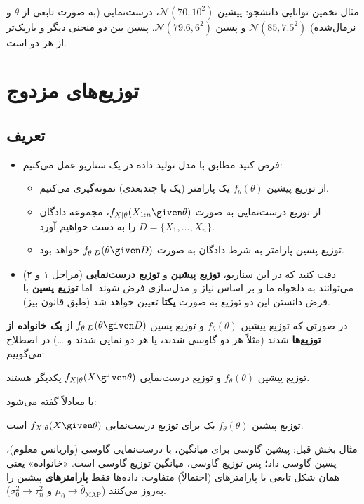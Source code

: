 \begin{center}
\begin{tikzpicture}
\end{tikzpicture}\\
{\small مثال تخمین توانایی دانشجو: پیشین $\mathcal N(70,10^2)$، درست‌نمایی (به صورت تابعی از $\theta$ و نرمال‌شده) $\mathcal N(85,7.5^2)$ و پسین $\mathcal N(79.6,6^2)$. پسین بین دو منحنی دیگر و باریک‌تر از هر دو است.}
\end{center}

\section{توزیع‌های مزدوج }

\subsection{تعریف}
\begin{itemize}
\item فرض کنید مطابق با مدل تولید داده  در یک سناریو  عمل می‌کنیم:
\begin{itemize}
\item از توزیع پیشین $f_\theta(\theta)$ یک پارامتر (یک یا چندبعدی) نمونه‌گیری می‌کنیم.
\item از توزیع درست‌نمایی  به صورت $f_{X|\theta}(X_{1:n}\given\theta)$، مجموعه دادگان $D=\{X_1,\ldots,X_n\}$ را به دست خواهیم آورد.
\item توزیع پسین پارامتر به شرط دادگان به صورت $f_{\theta|D}(\theta\given D)$ خواهد بود.
\end{itemize}
\item دقت کنید که در این سناریو، \textbf{توزیع پیشین} و \textbf{توزیع درست‌نمایی} (مراحل ۱ و ۲) می‌توانند به دلخواه ما و بر اساس نیاز و مدل‌سازی فرض شوند. اما \textbf{توزیع پسین} با فرض دانستن این دو توزیع به صورت \textbf{یکتا} تعیین خواهد شد (طبق قانون بیز).
\end{itemize}

\begin{definition}
در صورتی که توزیع پیشین $f_\theta(\theta)$ و توزیع پسین $f_{\theta|D}(\theta\given D)$ از \textbf{یک خانواده از توزیع‌ها} شدند (مثلاً هر دو گاوسی شدند، یا هر دو نمایی شدند و \ldots) در اصطلاح می‌گوییم:
\begin{center}
توزیع پیشین $f_\theta(\theta)$ و توزیع درست‌نمایی $f_{X|\theta}(X\given\theta)$  یکدیگر هستند.
\end{center}
یا معادلاً گفته می‌شود:
\begin{center}
توزیع پیشین $f_\theta(\theta)$ یک  برای توزیع درست‌نمایی $f_{X|\theta}(X\given\theta)$ است.
\end{center}
\end{definition}
مثال بخش قبل: پیشین گاوسی برای میانگین، با درست‌نمایی گاوسی (واریانس معلوم)، پسین گاوسی داد؛ پس توزیع گاوسی،  میانگین توزیع گاوسی است. «خانواده» یعنی همان شکل تابعی با پارامترهای (احتمالاً) متفاوت: داده‌ها فقط \textbf{پارامترهای} پیشین را به‌روز می‌کنند ($\mu_0\to\hat\theta_{\mathrm{MAP}}$ و $\sigma_0^2\to\tau_n^2$).

